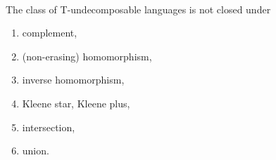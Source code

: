 \paragraph{}
\cveta The class of T-undecomposable languages is not closed under 
\begin{enumerate}
\item complement,
\item (non-erasing) homomorphism,
\item inverse homomorphism,
\item Kleene star, Kleene plus,
\item intersection,
\item union.
\end{enumerate}

\paragraph{}
\dokaz
